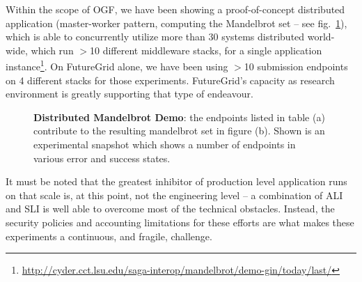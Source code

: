 \documentclass[]{paper}
\begin{document}
 Within the scope of OGF, we have been showing a proof-of-concept
 distributed application (master-worker pattern, computing the
 Mandelbrot set -- see fig.~\ref{fig:mandelbrot}), which is able to
 concurrently utilize more than 30 systems distributed world-wide,
 which run $>$10 different middleware stacks, for a single application
 instance\footnote{\url{http://cyder.cct.lsu.edu/saga-interop/mandelbrot/demo-gin/today/last/}}.
 On FutureGrid alone, we have been using $>$10 submission endpoints on
 4 different stacks for those experiments.  FutureGrid's capacity as
 research environment is greatly supporting that type of endeavour.

\begin{figure}[ht!]
 \begin{center}
  \vspace*{-1em}
  \caption{\textbf{Distributed Mandelbrot Demo}: the endpoints
   listed in table (a) contribute to the resulting mandelbrot set in
   figure (b).  Shown is an experimental snapshot which shows a number
   of endpoints in various error and success states.}
  \label{fig:mandelbrot}
 \end{center}
\end{figure}

 

 It must be noted that the greatest inhibitor of production level
 application runs on that scale is, at this point, not the
 engineering level -- a combination of ALI and SLI is well able to
 overcome most of the technical obstacles.  Instead, the security
 policies and accounting limitations for these efforts are what makes
 these experiments a continuous, and fragile, challenge.
\end{document}
